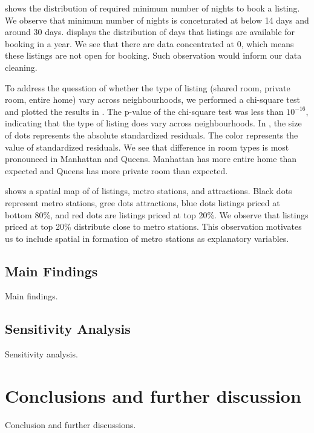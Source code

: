\documentclass[10pt]{jmlr}%
\begin{document}
 shows the distribution of required minimum number of nights to book a listing. We observe that minimum number of nights is concetnrated at below 14 days and around 30 days.  displays the distribution of days that listings are available for booking in a year. We see that there are data concentrated at 0, which means these listings are not open for booking. Such observation would inform our data cleaning.

To address the quesstion of whether the type of listing (shared room, private room, entire home) vary across neighbourhoods, we performed a chi-square test and plotted the results in . The p-value of the chi-square test was less than $10^{-16}$, indicating that the type of listing does vary across neighbourhoods. In , the size of dots represents the absolute standardized residuals. The color represents the value of standardized residuals. We see that difference in room types is most pronounced in Manhattan and Queens. Manhattan has more entire home than expected and Queens has more private room than expected.

 shows a spatial map of  of listings, metro stations, and attractions. Black dots represent metro stations, gree dots attractions, blue dots listings priced at bottom 80\%, and red dots are listings priced at top 20\%. We observe that listings priced at top 20\% distribute close to metro stations. This observation motivates us to include spatial in formation of metro stations as explanatory variables.



\subsection{Main Findings}
Main findings.

\subsection{Sensitivity Analysis}
Sensitivity analysis.

\section{Conclusions and further discussion}
\label{sec:conclusion}
Conclusion and further discussions.
\end{document}
